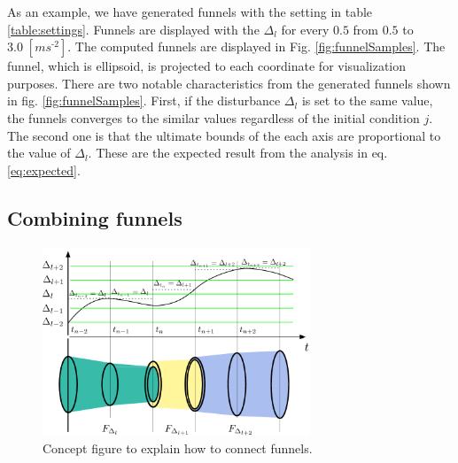 \documentclass[letterpaper, 10 pt, conference]{ieeeconf}  %
\begin{document}
As an example, we have generated funnels with the setting in table \ref{table:settings}.
Funnels are displayed with the $\Delta_l$ for every $0.5$ from $0.5$ to $3.0\;[m s^\text{-2}]$. 
The computed funnels are displayed in Fig. \ref{fig:funnelSamples}.
The funnel, which is ellipsoid, is projected to each coordinate for visualization purposes.
There are two notable characteristics from the generated funnels shown in fig. \ref{fig:funnelSamples}. 
First, if the disturbance $\Delta_l$ is set to the same value, the funnels converges to the similar values regardless of the initial condition $j$.
The second one is that the ultimate bounds of the each axis are proportional to the value of $\Delta_l$. 
These are the expected result from the analysis in eq. \eqref{eq:expected}.

\subsection{Combining funnels}
\begin{figure}[t]
\centering
\includegraphics[width=8cm]{funnel_combine.pdf}
\caption{Concept figure to explain how to connect funnels.}
 \label{fig:combiningConcept}
\end{figure}
\end{document}
